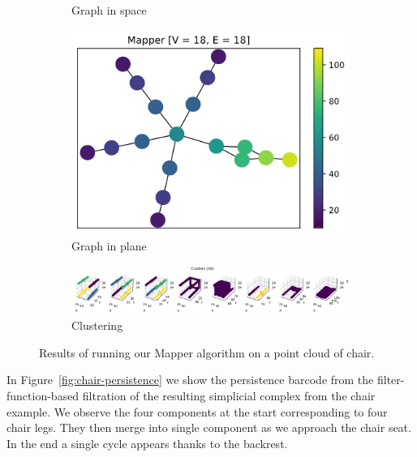 \documentclass{article}
\begin{document}
\begin{figure}[H]
\begin{subfigure}[c]{0.25\columnwidth}
        \caption{Graph in space}
        \label{fig:chair-space}
    \end{subfigure}
    \begin{subfigure}[c]{0.3\columnwidth}
        \centering
        \includegraphics[width=\textwidth]{chair-graph-2d}
        \caption{Graph in plane}
        \label{fig:chair-plane}
    \end{subfigure}
    \begin{subfigure}[c]{0.9\columnwidth}
        \centering
        \includegraphics[width=\textwidth]{chair-clusters}
        \caption{Clustering}
        \label{fig:chair-cluster}
    \end{subfigure}
    \caption{Results of running our Mapper algorithm on a point cloud of chair.}
    \label{fig:chair}
\end{figure}

In Figure~\ref{fig:chair-persistence} we show the persistence barcode from the
filter-function-based filtration of the resulting simplicial complex from the
chair example. We observe the four components at the start corresponding to four
chair legs. They then merge into single component as we approach the chair seat.
In the end a single cycle appears thanks to the backrest.
\end{document}

